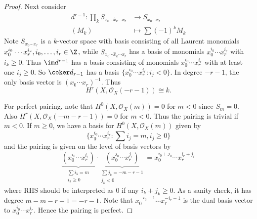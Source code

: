 \documentclass[a4paper]{article}
\newcommand{\sh}[1]{\mathcal{#1}} %
\begin{document}
\begin{proof}
  Next consider
  \begin{align*}
    d^{r - 1}: \prod_k S_{x_0 \cdots \hat x_k \cdots x_r} &\to S_{x_0 \cdots x_r} \\
    (M_k) &\mapsto \sum (-1)^k M_k
  \end{align*}
  Note \(S_{x_0 \cdots x_r}\) is a \(k\)-vector space with basis consisting of all Laurent monomials \(x_0^{i_0} \cdots x_r^{i_r}, i_0, \dots, i_r \in \Z\), while \(S_{x_0 \cdots \hat x_k \cdots x_r}\) has a basis of monomials \(x_0^{i_0} \cdots x_r^{i_r}\) with \(i_k \geq 0\). Thus \(\im d^{r - 1}\) has a basis consisting of monomials \(x_0^{i_0} \cdots x_r^{i_r}\) with at least one \(i_j \geq 0\). So \(\coker d_{r - 1}\) has a basis \(\{x_0^{i_0} \cdots x_r^{i_r}: i_j < 0\}\). In degree \(-r - 1\), the only basis vector is \((x_0 \cdots x_r)^{-1}\). Thus
  \[
    H^r(X, \sh O_X(-r - 1)) \cong k.
  \]

  For perfect pairing, note that \(H^0(X, \sh O_X(m)) = 0\) for \(m < 0\) since \(S_m = 0\). Also \(H^r(X, \sh O_X(-m - r - 1)) = 0\) for \(m < 0\). Thus the pairing is trivial if \(m < 0\). If \(m \geq 0\), we have a basis for \(H^0(X, \sh O_X(m))\) given by
  \[
    \{x_0^{i_0} \cdots x_r^{i_r}: \sum i_j = m, i_j \geq 0\}
  \]
  and the pairing is given on the level of basis vectors by
  \[
    \underbrace{(x_0^{i_0} \cdots x_r^{i_r})}_{\substack{\sum i_k = m \\ i_k \geq 0}} \cdot
    \underbrace{(x_0^{j_0} \cdots x_r^{j_r})}_{\substack{\sum j_k = -m - r - 1 \\ j_k < 0}}
    = x_0^{i_0 + j_0} \cdots x_r^{i_r + j_r}
  \]
  where RHS should be interpreted as \(0\) if any \(i_k + j_k \geq 0\). As a sanity check, it has degree \(m - m -r - 1 = -r - 1\). Note that \(x_0^{-i_0 - 1} \cdots x_r^{-i_r - 1}\) is the dual basis vector to \(x_0^{i_0} \cdots x_r^{i_r}\). Hence the pairing is perfect.


\end{proof}
\end{document}
